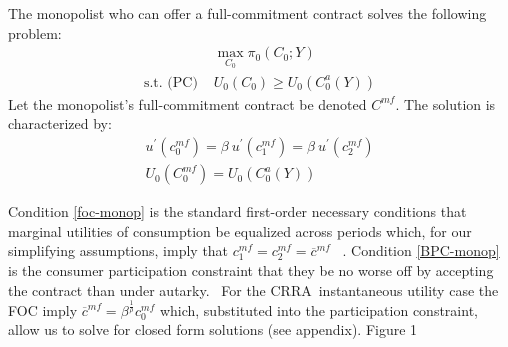 \documentclass[11pt]{article}%
\begin{document}
The monopolist who can offer a full-commitment contract solves the following
problem:
\begin{align*}
&  \max_{C_{0}}\pi_{0}\left(  C_{0};Y\right) \\
\text{s.t. (PC) }  &  U_{0}\left(  C_{0}\right)  \geq U_{0}\left(  C_{0}%
^{a}(Y)\right)
\end{align*}
Let the monopolist's full-commitment contract be denoted $C^{mf}$. The
solution is characterized by:
\begin{align}
  u^{\prime}\left(  c_{0}^{mf}\right)  =\beta\ u^{\prime}\left(  c_{1}
^{mf}\right)  =\beta\ u^{\prime}\left(  c_{2}^{mf}\right) \label{foc-monop}\\
  U_{0}\left(  C_{0}^{mf}\right)  =U_{0}\left(  C_{0}^{a}(Y)\right)
\label{BPC-monop}
\end{align}

Condition \ref{foc-monop} is the standard first-order necessary conditions
that marginal utilities of consumption be equalized across periods which, for our simplifying assumptions, imply that  $c_{1}^{mf}=c_{2}^{mf}=\overline{c}^{mf}$
\   \(\). Condition \ref{BPC-monop} is the consumer participation constraint that they
be no worse off by accepting the contract than under autarky. \ For the
CRRA\ instantaneous utility case the FOC  imply $\overline{c}^{mf}=\beta^{\frac
{1}{\rho}}c_{0}^{mf}$ which, substituted into the participation constraint, allow us to solve for 
 closed form solutions (see appendix).  Figure 1 
 
\end{document}
